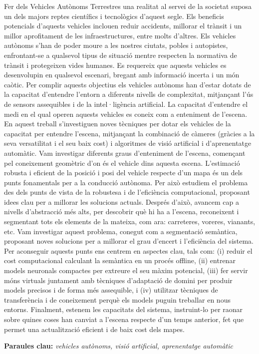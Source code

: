 \begin{otherlanguage}{catalan}
Fer dels Vehicles Autònoms Terrestres una realitat al servei de la societat suposa un dels majors reptes científics i tecnològics d'aquest segle. Els beneficis potencials d'aquests vehicles inclouen reduir accidents, millorar el trànsit i un millor aprofitament de les infraestructures, entre molts d’altres. Els vehicles autònoms s’han de poder moure a les nostres ciutats, pobles i autopistes, enfrontant-se a qualsevol tipus de situació mentre respecten la normativa de trànsit i protegeixen vides humanes. Es requereix que aquests vehicles es desenvolupin en qualsevol escenari, bregant amb informació incerta i un món caòtic. Per complir aquests objectius els vehicles autònoms han d'estar dotats de la capacitat d’entendre l'entorn a diferents nivells de complexitat, mitjançant l'ús de sensors assequibles i de la intel·ligència artificial. La capacitat d'entendre el medi en el qual operen aquests vehicles es coneix com a enteniment de l'escena. En aquest treball s'investiguen noves tècniques per dotar els vehicles de la capacitat per entendre l'escena, mitjançant la combinació de càmeres (gràcies a la seva versatilitat i el seu baix cost) i algoritmes de visió artificial i d’aprenentatge automàtic. Vam investigar diferents graus d'enteniment de l'escena, començant pel coneixement geomètric d’on és el vehicle dins aquesta escena. L'estimació robusta i eficient de la posició i posi del vehicle respecte d’un mapa és un dels punts fonamentals per a la conducció autònoma. Per això estudiem el problema des dels punts de vista de la robustesa i de l'eficiència computacional, proposant idees clau per a millorar les solucions actuals. Després d'això, avancem cap a nivells d'abstracció més alts, per descobrir què hi ha a l'escena, reconeixent i segmentant tots els elements de la mateixa, com ara: carreteres, voreres, vianants, etc. Vam investigar aquest problema, conegut com a segmentació semàntica, proposant noves solucions per a millorar el grau d'encert i l'eficiència del sistema. Per aconseguir aquests punts ens centrem en aspectes clau, tals com: (i) reduir el cost computacional calculant la semàntica en un procés offline, (ii) entrenar models neuronals compactes per extreure el seu màxim potencial, (iii) fer servir móns virtuals juntament amb tècniques d'adaptació de domini per produir models precisos i de forma més assequible, i (iv) utilitzar tècniques de transferència i de coneixement perquè els models puguin treballar en nous entorns. Finalment, estenem les capacitats del sistema, instruint-lo per raonar sobre quines coses han canviat a l'escena respecte d’un temps anterior, fet que permet una actualització eficient i de baix cost dels mapes.

\vspace{1mm}
\textbf{Paraules clau:} \textit{vehicles autònoms, visió artificial, aprenentatge automàtic}


\end{otherlanguage}

